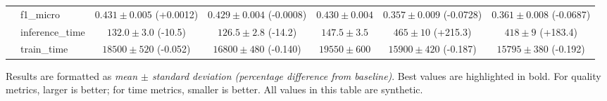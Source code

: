 \begin{table}[t]
\begin{threeparttable}
{\begin{tabular}{l l c c c c c}
 & f1\_micro & $0.431\pm0.005$ (+0.0012) & $0.429\pm0.004$ (-0.0008) & $0.430\pm0.004$ & $0.357\pm0.009$ (-0.0728) & $0.361\pm0.008$ (-0.0687) \\
 & inference\_time & $132.0\pm3.0$ (-10.5) & $126.5\pm2.8$ (-14.2) & $147.5\pm3.5$ & $465\pm10$ (+215.3) & $418\pm9$ (+183.4) \\
 & train\_time & $18500\pm520$ (-0.052) & $16800\pm480$ (-0.140) & $19550\pm600$ & $15900\pm420$ (-0.187) & $15795\pm380$ (-0.192) \\
\bottomrule
\end{tabular}%
}
\begin{tablenotes}
\footnotesize
\item Results are formatted as \textit{mean $\pm$ standard deviation (percentage difference from baseline)}. Best values are highlighted in bold. For quality metrics, larger is better; for time metrics, smaller is better. All values in this table are synthetic.
\end{tablenotes}
\end{threeparttable}
\end{table}
